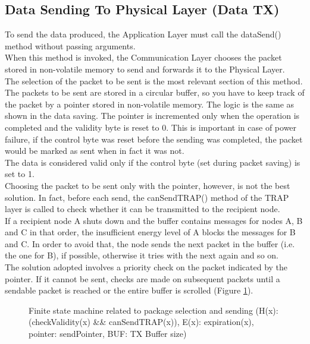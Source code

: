 \subsection{Data Sending To Physical Layer (Data TX)}
\label{sec:CommLayer2}
To send the data produced, the Application Layer must call the dataSend() method without passing arguments.\\
When this method is invoked, the Communication Layer chooses the packet stored in non-volatile memory to send and forwards it to the Physical Layer.\\
The selection of the packet to be sent is the most relevant section of this method.
The packets to be sent are stored in a circular buffer, so you have to keep track of the packet by a pointer stored in non-volatile memory. The logic is the same as shown in the data saving. The pointer is incremented only when the operation is completed and the validity byte is reset to 0. This is important in case of power failure, if the control byte was reset before the sending was completed, the packet would be marked as sent when in fact it was not.\\
The data is considered valid only if the control byte (set during packet saving) is set to 1.\\
Choosing the packet to be sent only with the pointer, however, is not the best solution. 
In fact, before each send, the canSendTRAP() method of the TRAP layer is called to check whether it can be transmitted to the recipient node.\\
If a recipient node A shuts down and the buffer contains messages for nodes A, B and C in that order, the insufficient energy level of A blocks the messages for B and C. In order to avoid that, the node sends the next packet in the buffer (i.e. the one for B), if possible, otherwise it tries with the next again and so on.\\
The solution adopted involves a priority check on the packet indicated by the pointer. If it cannot be sent, checks are made on subsequent packets until a sendable packet is reached or the entire buffer is scrolled (Figure \ref{fig:FSMSENDTX}).
\begin{figure}[H]
\centerline{}
\caption{\footnotesize \centering Finite state machine related to package selection and sending (H(x): (checkValidity(x) \&\& canSendTRAP(x)), E(x): expiration(x), pointer: sendPointer, BUF: TX Buffer size)}
\label{fig:FSMSENDTX}
\end{figure}

